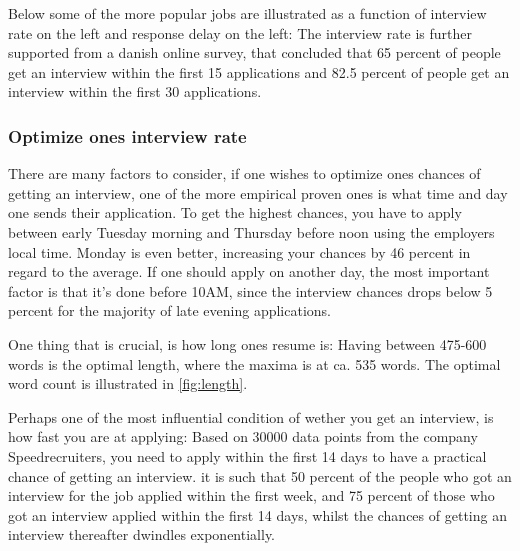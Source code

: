Below some of the more popular jobs are illustrated as a function of interview
rate on the left and response delay on the left:
The interview rate is further supported from a danish online survey, that concluded
that 65 percent of people get an interview within the first 15 applications and
82.5 percent of people get an interview within the first 30 applications.\cite{Amount_of_applications}
\clearpage

\subsubsection{Optimize ones interview rate}
There are many factors to consider, if one wishes to optimize ones
chances of getting an interview, one of the more empirical proven ones
is what time and day one sends their application.
To get the highest chances, you have to apply between early Tuesday morning
and Thursday before noon using the employers local time. Monday is even better,
increasing your chances by 46 percent in regard to the average.
If one should apply on another day, the most important factor is that
it's done before 10AM, since the interview chances drops below 5 percent for
the majority of late evening applications.\cite{Best_time_and_date}

One thing that is crucial, is how long ones resume is:
Having between 475-600 words is the optimal length, where the maxima is at
ca. 535 words. The optimal word count is illustrated in \vref{fig:length}.

Perhaps one of the most influential condition of wether you get an interview,
is how fast you are at applying:
Based on 30000 data points from the company Speedrecruiters, you need
to apply within the first 14 days to have a practical chance of getting an
interview. it is such that 50 percent of the people who got an interview
for the job applied within the first week, and 75 percent of those who
got an interview applied within the first 14 days, whilst the chances of
getting an interview thereafter dwindles exponentially.\cite{Best_time_and_dateV2}

